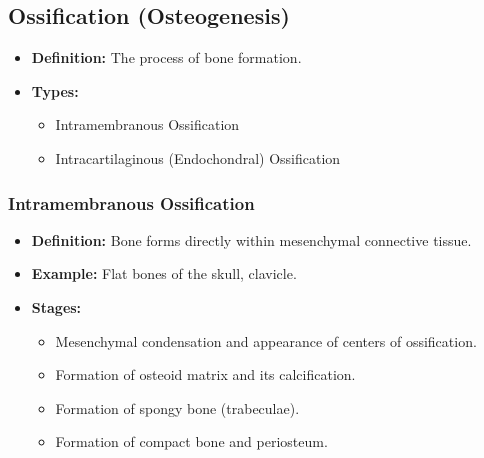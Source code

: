 \documentclass[11pt]{article}
\begin{document}
\subsection{Ossification (Osteogenesis)}
\begin{itemize}
    \item \textbf{Definition:} The process of bone formation.
    \item \textbf{Types:}
    \begin{itemize}
        \item Intramembranous Ossification
        \item Intracartilaginous (Endochondral) Ossification
    \end{itemize}
\end{itemize}

\subsubsection*{Intramembranous Ossification}
\begin{itemize}
    \item \textbf{Definition:} Bone forms directly within mesenchymal connective tissue.
    \item \textbf{Example:} Flat bones of the skull, clavicle.
    \item \textbf{Stages:}
    \begin{itemize}
        \item Mesenchymal condensation and appearance of centers of ossification.
        \item Formation of osteoid matrix and its calcification.
        \item Formation of spongy bone (trabeculae).
        \item Formation of compact bone and periosteum.
    \end{itemize}
\end{itemize}
\end{document}
